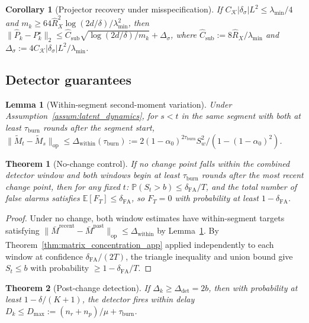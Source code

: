 \documentclass{article}
\newcommand{\E}{\mathbb{E}}
\newcommand{\Prob}{\mathbb{P}}
\newcommand{\op}{\mathrm{op}}
\newtheorem{lemma}{Lemma}
\newtheorem{theorem}{Theorem}
\newtheorem{corollary}{Corollary}
\begin{document}
\begin{corollary}[Projector recovery under misspecification]
\label{cor:projector_misspec}
If $C_{\mathcal K}|\delta_\sigma|L^2 \le \lambda_{\min}/4$ and $m_k \ge 64\hat R_X^2\log(2d/\delta)/\lambda_{\min}^2$, then
$\|\widehat P_k - P_k^\star\|_2 \le \hat C_{\mathrm{sub}}\sqrt{\log(2d/\delta)/m_k} + \Delta_\sigma$,
where $\hat C_{\mathrm{sub}} := 8\hat R_X/\lambda_{\min}$ and $\Delta_\sigma := 4C_{\mathcal K}|\delta_\sigma|L^2/\lambda_{\min}$.
\end{corollary}

\subsection{Detector guarantees}

\begin{lemma}[Within-segment second-moment variation]
\label{lem:within_segment_variation}
Under Assumption~\ref{assum:latent_dynamics}, for $s < t$ in the same segment with both at least $\tau_{\mathrm{burn}}$ rounds after the segment start,
$\|\widetilde M_t - \widetilde M_s\|_{\op} \le \Delta_{\mathrm{within}}(\tau_{\mathrm{burn}}) := 2(1-\alpha_0)^{2\tau_{\mathrm{burn}}} S_w^2/(1-(1-\alpha_0)^2)$.
\end{lemma}

\begin{theorem}[No-change control]
\label{thm:no_change_control}
If no change point falls within the combined detector window and both windows begin at least $\tau_{\mathrm{burn}}$ rounds after the most recent change point, then for any fixed $t$:
$\Prob(S_t > b) \le \delta_{\mathrm{FA}}/T$,
and the total number of false alarms satisfies $\E[F_T] \le \delta_{\mathrm{FA}}$, so $F_T = 0$ with probability at least $1 - \delta_{\mathrm{FA}}$.
\end{theorem}

\begin{proof}
Under no change, both window estimates have within-segment targets satisfying $\|\bar M^{\mathrm{recent}} - \bar M^{\mathrm{past}}\|_{\op} \le \Delta_{\mathrm{within}}$ by Lemma~\ref{lem:within_segment_variation}.
By Theorem~\ref{thm:matrix_concentration_app} applied independently to each window at confidence $\delta_{\mathrm{FA}}/(2T)$, the triangle inequality and union bound give $S_t \le b$ with probability $\ge 1 - \delta_{\mathrm{FA}}/T$.
\end{proof}

\begin{theorem}[Post-change detection]
\label{thm:post_change_detection}
If $\Delta_k \ge \Delta_{\mathrm{det}} = 2b$, then with probability at least $1 - \delta/(K+1)$, the detector fires within delay $D_k \le D_{\max} := (n_r + n_p)/\mu + \tau_{\mathrm{burn}}$.
\end{theorem}
\end{document}
